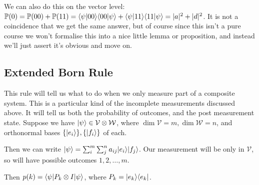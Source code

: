 \documentclass[10pt,a4paper]{article}
\begin{document}
We can also do this on the vector level: $\mathbb{P}(0) = \mathbb{P}(00) + \mathbb{P}(11) = \langle \psi | 00 \rangle\langle 00 | \psi \rangle + \langle \psi | 11 \rangle\langle 11 | \psi \rangle = |a|^2+|d|^2$. It is not a coincidence that we get the same answer, but of course since this isn't a pure course we won't formalise this into a nice little lemma or proposition, and instead we'll just assert it's obvious and move on.

\subsection{Extended Born Rule}
This rule will tell us what to do when we only measure part of a composite system. This is a particular kind of the incomplete measurements discussed above. It will tell us both the probability of outcomes, and the post measurement state. Suppose we have $|\psi\rangle \in \mathcal{V} \otimes \mathcal{W}$, where $\dim\mathcal{V} = m, \dim\mathcal{W} = n$, and orthonormal bases $\{|e_i\rangle\}, \{|f_i\rangle\}$ of each.

Then we can write $|\psi\rangle = \sum_i^m \sum_j^n a_{ij}|e_i\rangle|f_j\rangle$. Our measurement will be only in $\mathcal{V}$, so will have possible outcomes $1, 2, \ldots, m$.

Then $p(k) = \langle \psi|P_k \otimes I |\psi\rangle$, where $P_k = |e_k\rangle\langle e_k|$.
\end{document}
